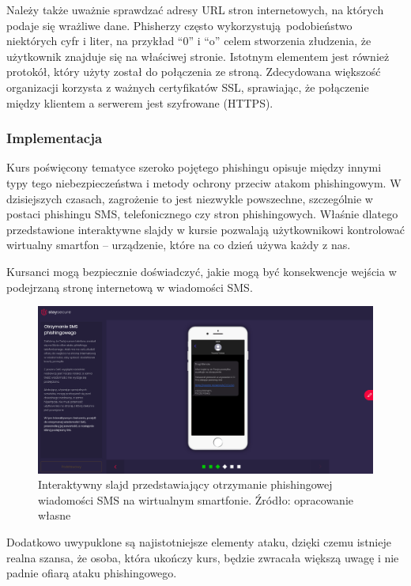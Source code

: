 \documentclass[12pt,twoside]{article}
\begin{document}
Należy także uważnie sprawdzać adresy URL stron internetowych, na których podaje się wrażliwe dane. Phisherzy często wykorzystują podobieństwo niektórych cyfr i liter, na przykład ``0'' i ``o'' celem stworzenia złudzenia, że użytkownik znajduje się na właściwej stronie. Istotnym elementem jest również protokół, który użyty został do połączenia ze stroną. Zdecydowana większość organizacji korzysta z ważnych certyfikatów SSL, sprawiając, że połączenie między klientem a serwerem jest szyfrowane (HTTPS).

\subsubsection{Implementacja}

Kurs poświęcony tematyce szeroko pojętego phishingu opisuje między innymi typy tego niebezpieczeństwa i metody ochrony przeciw atakom phishingowym. W dzisiejszych czasach, zagrożenie to jest niezwykle powszechne, szczególnie w postaci phishingu SMS, telefonicznego czy stron phishingowych. Właśnie dlatego przedstawione interaktywne slajdy w kursie pozwalają użytkownikowi kontrolować wirtualny smartfon -- urządzenie, które na co dzień używa każdy z nas. 

Kursanci mogą bezpiecznie doświadczyć, jakie mogą być konsekwencje wejścia w podejrzaną stronę internetową w wiadomości SMS.

\begin{figure}[H]
	\centering
	\includegraphics[width=1\linewidth]{figures/phishing-slide-screenshot1.png}
	\caption{Interaktywny slajd przedstawiający otrzymanie phishingowej wiadomości SMS na wirtualnym smartfonie. Źródło: opracowanie własne}
	\label{fig:phishing-organisations}
\end{figure}

Dodatkowo uwypuklone są najistotniejsze elementy ataku, dzięki czemu istnieje realna szansa, że osoba, która ukończy kurs, będzie zwracała większą uwagę i nie padnie ofiarą ataku phishingowego.
\end{document}
